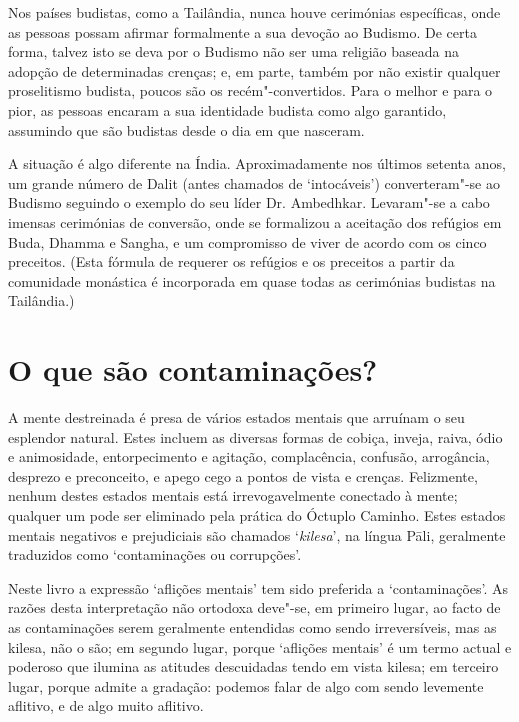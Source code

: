 Nos países budistas, como a Tailândia, nunca houve cerimónias
específicas, onde as pessoas possam afirmar formalmente a sua devoção ao
Budismo. De certa forma, talvez isto se deva por o Budismo não ser uma
religião baseada na adopção de determinadas crenças; e, em parte, também
por não existir qualquer proselitismo budista, poucos são os
recém"-convertidos. Para o melhor e para o pior, as pessoas encaram a sua
identidade budista como algo garantido, assumindo que são budistas desde
o dia em que nasceram.

A situação é algo diferente na Índia. Aproximadamente nos últimos
setenta anos, um grande número de Dalit (antes chamados de `intocáveis')
converteram"-se ao Budismo seguindo o exemplo do seu líder Dr. Ambedhkar.
Levaram"-se a cabo imensas cerimónias de conversão, onde se formalizou a
aceitação dos refúgios em Buda, Dhamma e Sangha, e um compromisso de
viver de acordo com os cinco preceitos. (Esta fórmula de requerer os
refúgios e os preceitos a partir da comunidade monástica é incorporada
em quase todas as cerimónias budistas na Tailândia.)

\section[O que são conta\kern-0.1pt minações?]{O que são contaminações?}

A mente destreinada é presa de vários estados mentais que arruínam o seu
esplendor natural. Estes incluem as diversas formas de cobiça, inveja,
raiva, ódio e animosidade, entorpecimento e agitação, complacência,
confusão, arrogância, desprezo e preconceito, e apego cego a pontos de
vista e crenças. Felizmente, nenhum destes estados mentais está
irrevogavelmente conectado à mente; qualquer um pode ser eliminado pela
prática do Óctuplo Caminho. Estes estados mentais negativos e
prejudiciais são chamados `\emph{kilesa}', na língua Pāli, geralmente
traduzidos como `contaminações ou corrupções'.

Neste livro a expressão `aflições mentais' tem sido preferida a
`contaminações'. As razões desta interpretação não ortodoxa deve"-se, em
primeiro lugar, ao facto de as contaminações serem geralmente entendidas
como sendo irreversíveis, mas as kilesa, não o são; em segundo lugar,
porque `aflições mentais' é um termo actual e poderoso que ilumina as
atitudes descuidadas tendo em vista kilesa; em terceiro lugar, porque
admite a gradação: podemos falar de algo com sendo levemente aflitivo, e
de algo muito aflitivo.

